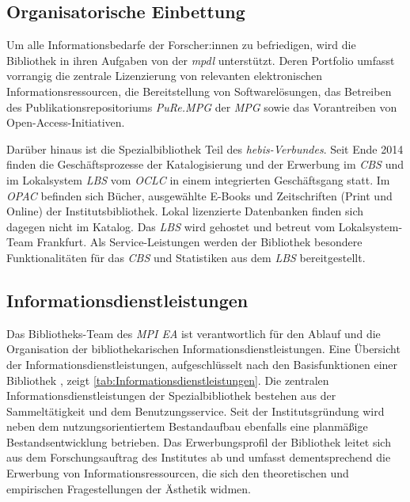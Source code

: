 \subsection{Organisatorische Einbettung}
Um alle Informationsbedarfe der Forscher:innen zu befriedigen, wird die Bibliothek in ihren Aufgaben von der
\textit{\acrlong{mpdl}} unterstützt. Deren Portfolio umfasst vorrangig die zentrale 
Lizenzierung von relevanten elektronischen Informationsressourcen, die Bereitstellung von Softwarelösungen, 
das Betreiben des Publikationsrepositoriums \textit{\acrshort{PuRe.MPG}} der \textit{\acrfull{MPG}} sowie
das Vorantreiben von Open-Access-Initiativen. 

Darüber hinaus ist die Spezialbibliothek Teil des \textit{\acrshort{hebis}-Verbundes}. 
Seit Ende 2014 finden die Geschäftsprozesse der Katalogisierung und der Erwerbung im \textit{\acrfull{CBS}} und 
im Lokalsystem \textit{\acrfull{LBS}} vom \textit{\acrshort{OCLC}} in einem integrierten Geschäftsgang statt. Im \textit{\acrfull{OPAC}} befinden sich Bücher, ausgewählte E-Books 
und Zeitschriften (Print und Online) der Institutsbibliothek. Lokal lizenzierte Datenbanken finden sich dagegen
nicht im Katalog. Das \textit{\acrshort{LBS}} wird gehostet und betreut 
vom Lokalsystem-Team Frankfurt. Als Service-Leistungen werden der Bibliothek besondere Funktionalitäten 
für das \textit{\acrlong{CBS}} und Statistiken aus dem \textit{\acrshort{LBS}} bereitgestellt.


\subsection{Informationsdienstleistungen}
Das Bibliotheks-Team des \textit{\acrshort{MPI EA}} ist verantwortlich für den Ablauf und die Organisation der bibliothekarischen 
Informationsdienstleistungen. Eine Übersicht der Informationsdienstleistungen,
aufgeschlüsselt nach den Basisfunktionen einer Bibliothek \cite[S. 204 f.]{rosch_bibliotheken_2019}, zeigt \autoref{tab:Informationsdienstleistungen}. 
Die zentralen Informationsdienstleistungen der Spezialbibliothek bestehen aus der Sammeltätigkeit und dem Benutzungsservice.
Seit der Institutsgründung wird neben dem nutzungsorientiertem Bestandaufbau ebenfalls eine planmäßige 
Bestandsentwicklung betrieben. Das Erwerbungsprofil der Bibliothek leitet sich aus dem Forschungsauftrag des Institutes 
ab und umfasst dementsprechend die Erwerbung von Informationsressourcen, die sich den theoretischen und 
empirischen Fragestellungen der Ästhetik widmen.


